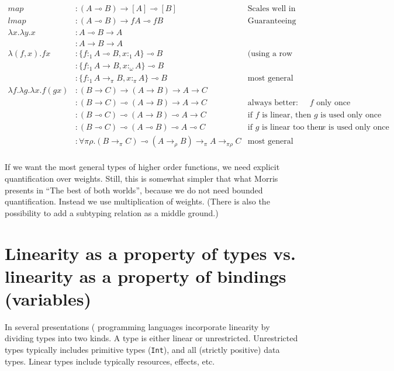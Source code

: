 \documentclass[11pt]{article}
\begin{document}
\hspace{-4cm}\begin{minipage}{\textwidth}
\begin{align*}
map & : (A ⊸ B) → [A] ⊸ [B] & \text{Scales well in unrestricted contexts}\\
lmap & : (A ⊸ B) → f A ⊸ f B & \text{Guaranteeing that no element is lost} \\
λx. λy. x & : A ⊸ B → A \\
          & : A → B → A \\
λ(f,x). f x & : \{f :_1 A ⊸ B, x :_1 A\} ⊸ B & \text{(using a row type for concision)}\\
            & : \{f :_1 A → B, x :_ω A\} ⊸ B \\
            & : \{f :_1 A →_π B, x :_π A\} ⊸ B & \text{most general type} \\ 
λf. λg. λx. f (g x) & : (B → C) → (A → B) → A → C \\
                    & : (B → C) ⊸ (A → B) → A → C & \text {always better: comp uses $f$  only once} \\
                    & : (B ⊸ C) ⊸ (A → B) ⊸ A → C & \text {if $f$ is linear, then $g$ is used only once} \\
                    & : (B ⊸ C) ⊸ (A ⊸ B) ⊸ A ⊸ C & \text {if $g$ is linear too then $x$ is used only once} \\
                    & : ∀ π ρ. (B →_π C) ⊸ (A →_ρ B) →_π A →_{πρ} C & \text{most general type} \\
\end{align*}
\end{minipage}

If we want the most general types of higher order functions, we need
explicit quantification over weights. Still, this is somewhat simpler
that what Morris presents in ``The best of both worlds'', because we
do not need bounded quantification. Instead we use multiplication of
weights. (There is also the possibility to add a subtyping relation as
a middle ground.)

\section{Linearity as a property of types vs. linearity as a property of bindings (variables)}

In several presentations (\cite{wadler_linear_1990,mazurak_lightweight_2010,morris_best_2016}
programming languages incorporate
linearity by dividing types into two kinds. A type is either linear
or unrestricted. Unrestricted types typically includes primitive types
(\texttt{Int}), and all (strictly positive) data types. Linear types
include typically resources, effects, etc.
\end{document}
